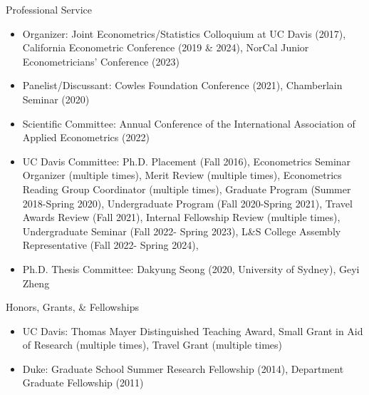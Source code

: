 \documentclass{article}
\begin{document}
\bigskip\noindent Professional Service 
\begin{itemize}
\item[] Organizer: 
Joint Econometrics/Statistics Colloquium at UC Davis (2017), %
California Econometric Conference (2019 \& 2024), %
NorCal Junior Econometricians’ Conference (2023) %
\item[] Panelist/Discussant: 
Cowles Foundation Conference (2021), %
Chamberlain Seminar (2020)%
\item[] Scientific Committee: 
Annual Conference of the International Association of Applied Econometrics (2022)
\item[] UC Davis Committee: 
Ph.D. Placement (Fall 2016), 
Econometrics Seminar Organizer  (multiple times), 
Merit Review (multiple times), 
Econometrics Reading Group Coordinator (multiple times), 
Graduate Program (Summer 2018-Spring 2020),
Undergraduate Program  (Fall 2020-Spring 2021),
Travel Awards Review  (Fall 2021),
Internal Fellowship Review  (multiple times),
Undergraduate Seminar (Fall 2022- Spring 2023), 
L\&S College Assembly Representative (Fall 2022- Spring 2024), 
\item[] Ph.D. Thesis Committee: Dakyung Seong (2020, University of Sydney), Geyi Zheng
\end{itemize}
\bigskip\noindent Honors, Grants, \& Fellowships 
\begin{itemize}
\item[] UC Davis: Thomas Mayer Distinguished Teaching Award, Small Grant in Aid of Research (multiple times), Travel Grant (multiple times)
\item[] Duke:  Graduate School Summer Research Fellowship (2014), Department Graduate Fellowship (2011)
\end{itemize}
\end{document}

